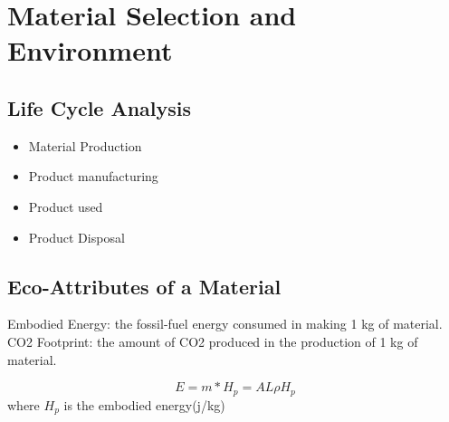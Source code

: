 \documentclass{article}
\begin{document}
       \section*{Material Selection and Environment} 
       \subsection*{Life Cycle Analysis}
       \begin{itemize}
           \item Material Production
           \item Product manufacturing
           \item Product used
           \item Product Disposal
       \end{itemize}

       \subsection*{Eco-Attributes of a Material}
       Embodied Energy: the fossil-fuel energy consumed in making 1 kg of  material.
       CO2 Footprint: the amount of CO2 produced in the production of 1 kg of material.

       \begin{equation*}
            E = m * H_{p} = AL \rho H_{p}
       \end{equation*}
       where $H_{p}$ is the embodied energy(j/kg)





        
        
\end{document}
